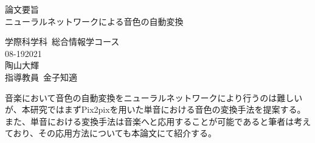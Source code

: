\documentclass[10pt,a4paper,dvipdfmx]{jsreport}
\begin{document}
\begin{center}
{\huge 論文要旨}\\
\vspace{40truept}
{\huge ニューラルネットワークによる音色の自動変換}
\end{center}

\vspace{30truept}

\begin{flushright}
{\Large 学際科学科~総合情報学コース}\\ 
\vspace{5truept}
{\Large 08-192021}\\ 
\vspace{5truept}
{\Large 陶山大輝}\\
\vspace{5truept} 
{\Large 指導教員~金子知適}\\
\end{flushright}

\vspace{30truept}

{\Large 音楽において音色の自動変換をニューラルネットワークにより行うのは難しいが、本研究ではまずPix2pixを用いた単音における音色の変換手法を提案する。また、単音における変換手法は音楽へと応用することが可能であると筆者は考えており、その応用方法についても本論文にて紹介する。}
\end{document}
